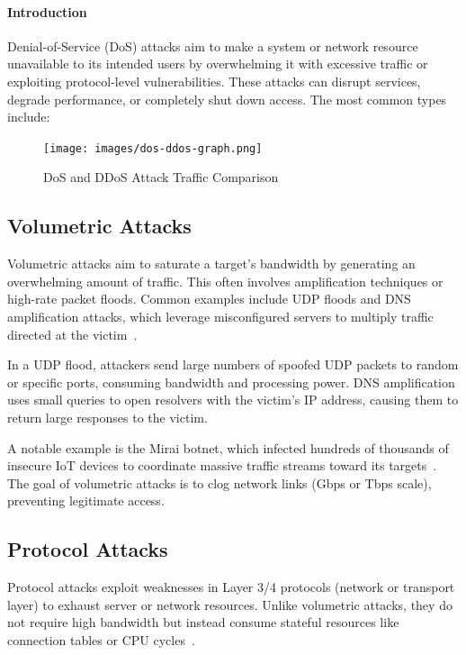 \documentclass[12pt]{report}
\begin{document}
\paragraph{Introduction} 
Denial-of-Service (DoS) attacks aim to make a system or network resource unavailable to its intended users by overwhelming it with excessive traffic or exploiting protocol-level vulnerabilities. These attacks can disrupt services, degrade performance, or completely shut down access. The most common types include:

\begin{figure}[ht]
    \centering
    \texttt{[image: images/dos-ddos-graph.png]}
    \caption{DoS and DDoS Attack Traffic Comparison}
    \label{fig:dos-ddos-graph}
    \vspace{-0.5em}
\end{figure}

\subsection{Volumetric Attacks}
Volumetric attacks aim to saturate a target’s bandwidth by generating an overwhelming amount of traffic. This often involves amplification techniques or high-rate packet floods. Common examples include UDP floods and DNS amplification attacks, which leverage misconfigured servers to multiply traffic directed at the victim~\cite{fidelis_dos}.

In a UDP flood, attackers send large numbers of spoofed UDP packets to random or specific ports, consuming bandwidth and processing power. DNS amplification uses small queries to open resolvers with the victim’s IP address, causing them to return large responses to the victim. 

A notable example is the Mirai botnet, which infected hundreds of thousands of insecure IoT devices to coordinate massive traffic streams toward its targets~\cite{fidelis_dos}. The goal of volumetric attacks is to clog network links (Gbps or Tbps scale), preventing legitimate access.

\subsection{Protocol Attacks}
Protocol attacks exploit weaknesses in Layer 3/4 protocols (network or transport layer) to exhaust server or network resources. Unlike volumetric attacks, they do not require high bandwidth but instead consume stateful resources like connection tables or CPU cycles~\cite{fidelis_dos}.
\end{document}
